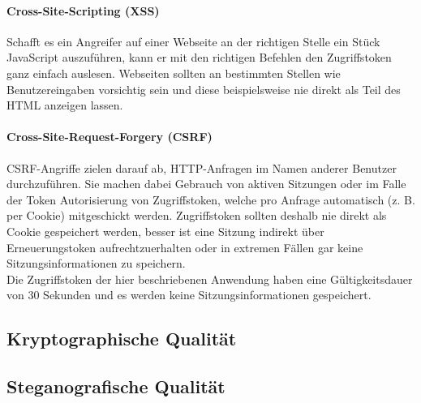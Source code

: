 \paragraph{Cross-Site-Scripting (XSS)}
Schafft es ein Angreifer auf einer Webseite an der richtigen Stelle
ein Stück JavaScript auszuführen,
kann er mit den richtigen Befehlen den Zugriffstoken ganz einfach auslesen.
Webseiten sollten an bestimmten Stellen wie Benutzereingaben vorsichtig sein und diese
beispielsweise nie direkt als Teil des HTML anzeigen lassen.

\paragraph{Cross-Site-Request-Forgery (CSRF)}
CSRF-Angriffe zielen darauf ab, HTTP-An\-fragen im
Namen anderer Benutzer durchzuführen. Sie machen dabei Gebrauch von
aktiven Sitzungen oder im Falle der Token Autorisierung von Zugriffstoken,
welche pro Anfrage automatisch (z. B. per Cookie) mitgeschickt werden.
Zugriffstoken sollten deshalb nie direkt als Cookie gespeichert werden, besser
ist eine Sitzung indirekt über Erneuerungstoken aufrechtzuerhalten oder
in extremen Fällen gar keine Sitzungsinformationen zu speichern.\\

\noindent
Die Zugriffstoken der hier beschriebenen Anwendung haben eine Gültigkeitsdauer
von 30 Sekunden und es werden keine Sitzungsinformationen gespeichert.

\subsection{Kryptographische Qualität}

\subsection{Steganografische Qualität}